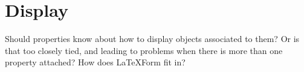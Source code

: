 
\section{Display}

Should properties know about how to display objects associated to
them? Or is that too closely tied, and leading to problems when there
is more than one property attached? How does LaTeXForm fit in?
